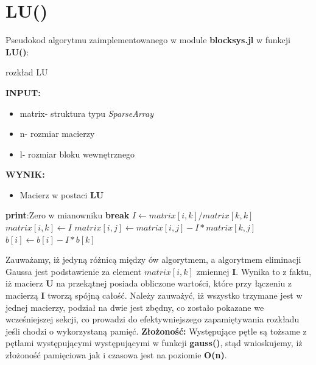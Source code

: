 \documentclass[a4paper,14pt]{report}
\begin{document}
  \section{LU()}
  Pseudokod algorytmu zaimplementowanego w module \textbf{blocksys.jl} w funkcji \textbf{LU()}:
  \begin{algorithm}[H]
    \caption{rozkład LU}
    \textbf{INPUT:}
    \begin{itemize}
      \item matrix- struktura typu \textit{SparseArray}
      \item n- rozmiar macierzy
      \item l- rozmiar bloku wewnętrznego
    \end{itemize}
    \textbf{WYNIK:}
    \begin{itemize}
      \item Macierz w postaci \textbf{LU}
    \end{itemize}
    \begin{algorithmic} 
            \STATE \textbf{print}:Zero w mianowniku
            \STATE \textbf{break}
          \ENDIF
          \STATE $I \leftarrow matrix[i,k]/matrix[k,k]$
          \STATE $matrix[i,k] \leftarrow I$
            \STATE $matrix[i,j] \leftarrow matrix[i,j]-I*matrix[k,j]$
          \ENDFOR
          \STATE $b[i] \leftarrow b[i]-I*b[k]$
        \ENDFOR
      \ENDFOR
      \end{algorithmic}
  \end{algorithm}
  Zauważamy, iż jedyną różnicą między ów algorytmem, a algorytmem eliminacji Gaussa jest podstawienie za element $matrix[i,k]$ zmiennej \textbf{I}. Wynika to z faktu, iż macierz \textbf{U} na przekątnej posiada obliczone wartości, które przy łączeniu z macierzą \textbf{I} tworzą spójną całość. Należy zauważyć, iż wszystko trzymane jest w jednej macierzy, podział na dwie jest zbędny, co zostało pokazane we wcześniejszej sekcji, co prowadzi do efektywniejszego zapamiętywania rozkładu jeśli chodzi o wykorzystaną pamięć.
  \textbf{Złożoność:}
    Występujące pętle są tożsame z pętlami występującymi występującymi w funkcji \textbf{gauss()}, stąd wnioskujemy, iż złożoność pamięciowa jak i czasowa jest na poziomie \textbf{O(n)}.
\end{document}
